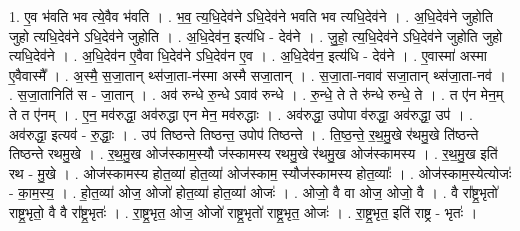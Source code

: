 \documentclass[17pt]{extarticle}
\begin{document}
1. ए॒व भ॑वति भव त्ये॒वैव भ॑वति । . भ॒व॒ त्य॒धि॒देव॑ने ऽधि॒देव॑ने भवति भव त्यधि॒देव॑ने । . अ॒धि॒देव॑ने जुहोति जुहो त्यधि॒देव॑ने ऽधि॒देव॑ने जुहोति । . अ॒धि॒देव॑न॒ इत्य॑धि - देव॑ने । . जु॒हो॒ त्य॒धि॒देव॑ने ऽधि॒देव॑ने जुहोति जुहो त्यधि॒देव॑ने । . अ॒धि॒देव॑न ए॒वैवा धि॒देव॑ने ऽधि॒देव॑न ए॒व । . अ॒धि॒देव॑न॒ इत्य॑धि - देव॑ने । . ए॒वास्मा॑ अस्मा ए॒वैवास्मै᳚ । . अ॒स्मै॒ स॒जा॒तान् थ्स॑जा॒ता-न॑स्मा अस्मै सजा॒तान् । . स॒जा॒ता-नवाव॑ सजा॒तान् थ्स॑जा॒ता-नव॑ । . स॒जा॒तानिति॑ स - जा॒तान् । . अव॑ रुन्धे रु॒न्धे ऽवाव॑ रुन्धे । . रु॒न्धे॒ ते ते रु॑न्धे रुन्धे॒ ते । . त ए॑न मेन॒म् ते त ए॑नम् । . ए॒न॒ मव॑रुद्धा॒ अव॑रुद्धा एन मेन॒ मव॑रुद्धाः । . अव॑रुद्धा॒ उपोपा व॑रुद्धा॒ अव॑रुद्धा॒ उप॑ । . अव॑रुद्धा॒ इत्यव॑ - रु॒द्धाः॒ । . उप॑ तिष्ठन्ते तिष्ठन्त॒ उपोप॑ तिष्ठन्ते । . ति॒ष्ठ॒न्ते॒ र॒थ॒मु॒खे र॑थमु॒खे ति॑ष्ठन्ते तिष्ठन्ते रथमु॒खे । . र॒थ॒मु॒ख ओज॑स्काम॒स्यौ ज॑स्कामस्य रथमु॒खे र॑थमु॒ख ओज॑स्कामस्य । . र॒थ॒मु॒ख इति॑ रथ - मु॒खे । . ओज॑स्कामस्य होत॒व्या॑ होत॒व्या॑ ओज॑स्काम॒ स्यौज॑स्कामस्य होत॒व्याः᳚ । . ओज॑स्काम॒स्येत्योजः॑ - का॒म॒स्य॒ । . हो॒त॒व्या॑ ओज॒ ओजो॑ होत॒व्या॑ होत॒व्या॑ ओजः॑ । . ओजो॒ वै वा ओज॒ ओजो॒ वै । . वै रा᳚ष्ट्र॒भृतो॑ राष्ट्र॒भृतो॒ वै वै रा᳚ष्ट्र॒भृतः॑ । . रा॒ष्ट्र॒भृत॒ ओज॒ ओजो॑ राष्ट्र॒भृतो॑ राष्ट्र॒भृत॒ ओजः॑ । . रा॒ष्ट्र॒भृत॒ इति॑ राष्ट्र - भृतः॑ । \newline
\end{document}
